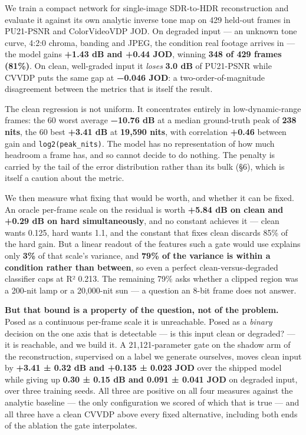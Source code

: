 We train a compact network for single-image SDR-to-HDR reconstruction and
evaluate it against its own analytic inverse tone map on 429 held-out frames in
PU21-PSNR and ColorVideoVDP JOD. On degraded input --- an unknown tone curve,
4:2:0 chroma, banding and JPEG, the condition real footage arrives in --- the
model gains \textbf{+1.43 dB and +0.44 JOD}, winning \textbf{348 of 429 frames (81\%)}. On
clean, well-graded input it \emph{loses} \textbf{3.0 dB} of PU21-PSNR while CVVDP puts the
same gap at \textbf{−0.046 JOD}: a two-order-of-magnitude disagreement between the
metrics that is itself the result.

The clean regression is not uniform. It concentrates entirely in
low-dynamic-range frames: the 60 worst average \textbf{−10.76 dB} at a median
ground-truth peak of \textbf{238 nits}, the 60 best \textbf{+3.41 dB} at \textbf{19,590 nits},
with correlation \textbf{+0.46} between gain and \texttt{log2(peak\_nits)}. The model has no
representation of how much headroom a frame has, and so cannot decide to do
nothing. The penalty is carried by the tail of the error distribution rather
than its bulk (§6), which is itself a caution about the metric.

We then measure what fixing that would be worth, and whether it can be fixed. An
oracle per-frame scale on the residual is worth \textbf{+5.84 dB on clean and +0.29 dB
on hard simultaneously}, and no constant achieves it --- clean wants 0.125, hard
wants 1.1, and the constant that fixes clean discards 85\% of the hard gain. But
a linear readout of the features such a gate would use explains only \textbf{3\%} of
that scale's variance, and \textbf{79\% of the variance is within a condition rather
than between}, so even a perfect clean-versus-degraded classifier caps at
R² 0.213. The remaining 79\% asks whether a clipped region was a 200-nit lamp or
a 20,000-nit sun --- a question an 8-bit frame does not answer.

\textbf{But that bound is a property of the question, not of the problem.} Posed as a
continuous per-frame scale it is unreachable. Posed as a \emph{binary} decision on
the one axis that is detectable --- is this input clean or degraded? --- it is
reachable, and we build it. A 21,121-parameter gate on the shadow arm of the
reconstruction, supervised on a label we generate ourselves, moves clean input
by \textbf{+3.41 ± 0.32 dB and +0.135 ± 0.023 JOD} over the shipped model while
giving up \textbf{0.30 ± 0.15 dB and 0.091 ± 0.041 JOD} on degraded input, over three
training seeds. All three are positive on all four measures against the analytic
baseline --- the only configuration we scored of which that is true --- and all
three have a clean CVVDP above every fixed alternative, including both ends of
the ablation the gate interpolates.

